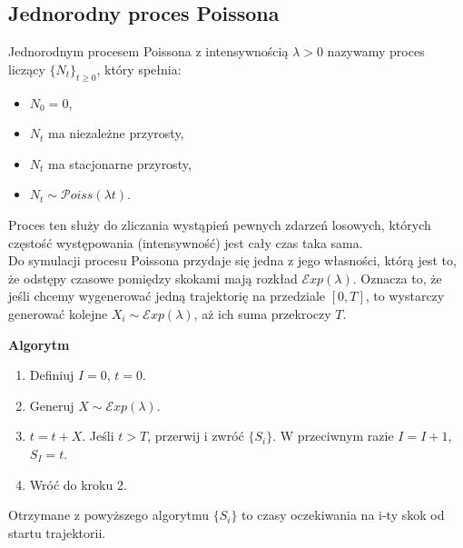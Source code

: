 \documentclass[12pt]{mwart}
\begin{document}
	\subsection{Jednorodny proces Poissona}
	\noindent Jednorodnym procesem Poissona z intensywnością $\lambda > 0$ nazywamy proces liczący $\{N_t\}_{t \geq 0}$, który spełnia:
	\begin{itemize}
		\item $N_0 = 0$,
		\item $N_t$ ma niezależne przyrosty,
		\item $N_t$ ma stacjonarne przyrosty,
		\item $N_t \sim \mathcal{P}oiss(\lambda t)$.
	\end{itemize}
	Proces ten służy do zliczania wystąpień pewnych zdarzeń losowych, których częstość występowania (intensywność) jest cały czas taka sama.\\
	Do symulacji procesu Poissona przydaje się jedna z jego własności, którą jest to, że odstępy czasowe pomiędzy skokami mają rozkład $\mathcal{E}xp(\lambda)$.
	Oznacza to, że jeśli chcemy wygenerować jedną trajektorię na przedziale $[0, T]$, to wystarczy generować kolejne $X_i \sim \mathcal{E}xp(\lambda)$, aż ich suma przekroczy $T$.
	
	\noindent \textbf{Algorytm}
	\begin{enumerate}
		\item Definiuj $I = 0$, $t=0$.
		\item Generuj $X \sim \mathcal{E}xp(\lambda)$.
		\item $t = t + X$. Jeśli $t > T$, przerwij i zwróć $\{S_i\}$. W przeciwnym razie $I = I + 1$, $S_I = t$.
		\item Wróć do kroku 2.
	\end{enumerate}
	Otrzymane z powyższego algorytmu $\{S_i\}$ to czasy oczekiwania na i-ty skok od startu trajektorii.
	
	
\end{document}
